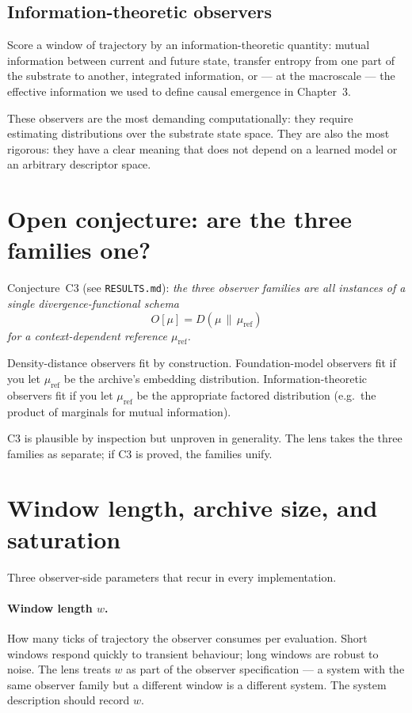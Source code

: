 \subsection*{Information-theoretic observers}

Score a window of trajectory by an information-theoretic quantity:
mutual information between current and future state, transfer
entropy from one part of the substrate to another, integrated
information, or --- at the macroscale --- the effective information
we used to define causal emergence in Chapter~3.

These observers are the most demanding computationally: they require
estimating distributions over the substrate state space. They are
also the most rigorous: they have a clear meaning that does not
depend on a learned model or an arbitrary descriptor space.

\section{Open conjecture: are the three families one?}

Conjecture~C3 (see \texttt{RESULTS.md}): \emph{the three observer
families are all instances of a single divergence-functional schema}
\[
  O[\mu] = D(\mu \,\|\, \mu_{\mathrm{ref}})
\]
\emph{for a context-dependent reference $\mu_{\mathrm{ref}}$.}

Density-distance observers fit by construction. Foundation-model
observers fit if you let $\mu_{\mathrm{ref}}$ be the archive's
embedding distribution. Information-theoretic observers fit if you
let $\mu_{\mathrm{ref}}$ be the appropriate factored distribution
(e.g.\ the product of marginals for mutual information).

C3 is plausible by inspection but unproven in generality. The lens
takes the three families as separate; if C3 is proved, the families
unify.

\section{Window length, archive size, and saturation}

Three observer-side parameters that recur in every implementation.

\paragraph{Window length $w$.} How many ticks of trajectory the
observer consumes per evaluation. Short windows respond quickly to
transient behaviour; long windows are robust to noise. The lens
treats $w$ as part of the observer specification --- a system with
the same observer family but a different window is a different
system. The system description should record $w$.


